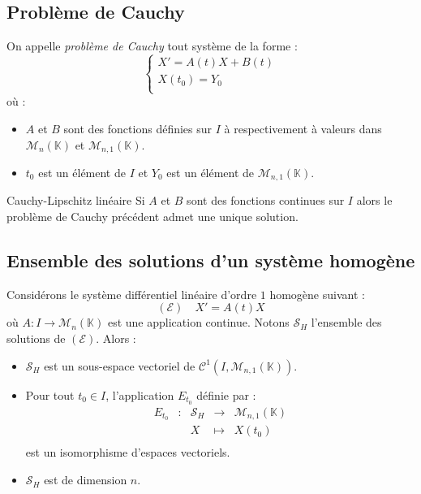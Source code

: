 \documentclass[french,11pt,twoside]{VcCours}
\begin{document}
\subsection{Problème de Cauchy}
\begin{Definition}{} On appelle \emph{problème de Cauchy} tout système de la forme :
$$ \left\lbrace \begin{array}{l}
X'=A(t)X+B(t) \\
X(t_0)=Y_0 \\
\end{array}\right.$$
où :
\begin{itemize}
\item $A$ et $B$ sont des fonctions définies sur $I$ à respectivement à valeurs dans $\mathcal{M}_n(\mathbb{K})$ et $\mathcal{M}_{n,1}(\mathbb{K})$.
\item $t_0$ est un élément de $I$ et $Y_0$ est un élément de $\mathcal{M}_{n,1}(\mathbb{K})$.
\end{itemize}
\end{Definition}

\begin{Theoreme}{Cauchy-Lipschitz linéaire} Si $A$ et $B$ sont des fonctions continues sur $I$ alors le problème de Cauchy précédent admet une unique solution.
\end{Theoreme}

\subsection{Ensemble des solutions d'un système homogène}

\begin{Proposition}{} Considérons le système différentiel linéaire d'ordre $1$ homogène suivant :
$$ (\mathcal{E}) \quad X'=A(t)X$$
où $A : I \rightarrow \mathcal{M}_n(\mathbb{K})$ est une application continue. Notons $\mathcal{S}_H$ l'ensemble des solutions de $(\mathcal{E})$. Alors :

\begin{itemize}
\item $\mathcal{S}_H$ est un sous-espace vectoriel de $\mathcal{C}^1(I, \mathcal{M}_{n,1}(\mathbb{K}))$.
\item Pour tout $t_0 \in I$, l'application $E_{t_0}$ définie par :
$$ \begin{array}{cclll}
E_{t_0} & : & \mathcal{S}_H & \rightarrow & \mathcal{M}_{n,1}(\mathbb{K}) \\
& & X & \mapsto & X(t_0) \\
\end{array}$$
est un isomorphisme d'espaces vectoriels. 
\item $\mathcal{S}_H$ est de dimension $n$.
\end{itemize}
\end{Proposition}
\end{document}
